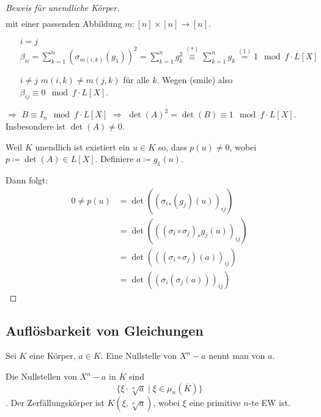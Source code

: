 \documentclass[../main.tex]{subfiles}
\begin{document}
\begin{proof} [Beweis für unendliche Körper]
\begin{align*}
    \end{align*}
    mit einer passenden Abbildung $m\colon [n]\times [n] \rightarrow [n]$.
    \begin{itemize}
        \item[$i=j$]
        $\beta_{ii} = \sum_{k=1}^n \left(\sigma_{m(i,k)}(g_1)\right)^2 =\sum_{k=1}^n g_k^2\overset{(*)}{\equiv} \sum_{k=1}^n g_k \overset{(1)}{=} 1 \mod f\cdot L[X] $
        \item[$i\neq j$]
        $m(i,k) \neq m(j,k)$ für alle $k$.
        Wegen (smile) also $\beta_{ij}\equiv 0\mod f\cdot L[X]$.
    \end{itemize}

    $\Rightarrow$ $B\equiv I_n\mod f\cdot L[X]$
    $\Rightarrow$ $\det(A)^2 = \det(B)\equiv 1 \mod f\cdot L[X]$.
    Insbesondere ist $\det(A)\neq 0$.

    Weil $K$ unendlich ist existiert ein $u\in K$ so, dass $p(u)\neq 0$, wobei $p\coloneqq \det(A)\in L[X]$.
    Definiere $a\coloneqq g_1(u)$.

    Dann folgt:
    \begin{align*}
        0\neq p(u) &= \det\left(\left({\sigma_i}_*\left(g_j\right)(u)\right)_{ij}\right)\\
        &= \det\left(\left((\sigma_i\circ \sigma_j)_* g_j(u)\right)_{ij}\right)\\
        &= \det\left(\left((\sigma_i\circ \sigma_j)(a)\right)_{ij}\right)\\
        &= \det\left(\left(\sigma_i(\sigma_j(a))\right)_{ij}\right)
    \end{align*}
\end{proof}

\subsection{Auflösbarkeit von Gleichungen}
\begin{definition}
    Sei $K$ eine Körper, $a\in K$.
    Eine Nullstelle von $X^n-a$ nennt man  von $a$.
\end{definition}
Die Nullstellen von $X^n-a$ in $\overline{K}$ sind $$\{\xi\cdot \sqrt[n]{a}\mid \xi \in \mu_n(\overline{K})\}$$.
Der Zerfällungskörper ist $K(\xi,\sqrt[n]{a})$, wobei $\xi$ eine primitive $n$-te EW ist.
\end{document}
